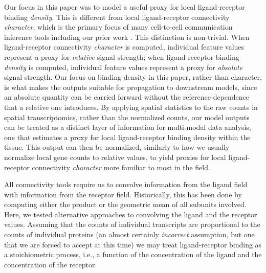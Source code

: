 \documentclass[10pt,letterpaper]{article}
\begin{document}
Our focus in this paper was to model a useful proxy for local ligand-receptor binding \textit{density}. This is different from local ligand-receptor connectivity \textit{character}, which is the primary focus of many cell-to-cell communication inference tools including our prior work \cite{Raredon2022}. This distinction is non-trivial. When ligand-receptor connectivity \textit{character} is computed, individual feature values represent a proxy for \textit{relative} signal strength; when ligand-receptor binding \textit{density} is computed, individual feature values represent a proxy for \textit{absolute} signal strength. Our focus on binding density in this paper, rather than character, is what makes the outputs suitable for propagation to downstream models, since an absolute quantity can be carried forward without the reference-dependence that a relative one introduces. By applying spatial statistics to the raw counts in spatial transcriptomics, rather than the normalized counts, our model outputs can be treated as a distinct layer of information for multi-modal data analysis, one that estimates a proxy for local ligand-receptor binding density within the tissue. This output can then be normalized, similarly to how we usually normalize local gene counts to relative values, to yield proxies for local ligand-receptor connectivity \textit{character} more familiar to most in the field.

All connectivity tools require us to convolve information from the ligand field with information from the receptor field. Historically, this has been done by computing either the product \cite{Raredon2022} or the geometric mean \cite{Wilk2024} of all subunits involved. Here, we tested alternative approaches to convolving the ligand and the receptor values. Assuming that the counts of individual transcripts are proportional to the counts of individual proteins (an almost certainly \textit{incorrect} assumption, but one that we are forced to accept at this time) we may treat ligand-receptor binding as a stoichiometric process, i.e., a function of the concentration of the ligand and the concentration of the receptor.
\end{document}
